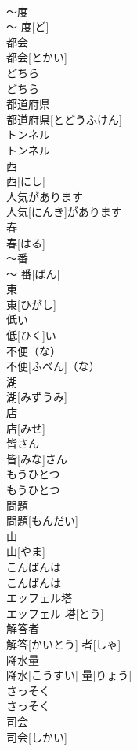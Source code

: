 \documentclass[8pt]{extreport}
\begin{document}
\begin{CJK}{UTF8}{min}
\\	〜度	
\\	〜 度[ど]		
\\	都会	
\\	都会[とかい]		
\\	どちら	
\\	どちら		
\\	都道府県	
\\	都道府県[とどうふけん]		
\\	トンネル	
\\	トンネル		
\\	西	
\\	西[にし]		
\\	人気があります	
\\	人気[にんき]があります		
\\	春	
\\	春[はる]		
\\	〜番	
\\	〜 番[ばん]		
\\	東	
\\	東[ひがし]		
\\	低い	
\\	低[ひく]い		
\\	不便（な）	
\\	不便[ふべん]（な）		
\\	湖	
\\	湖[みずうみ]		
\\	店	
\\	店[みせ]		
\\	皆さん	
\\	皆[みな]さん		
\\	もうひとつ	
\\	もうひとつ		
\\	問題	
\\	問題[もんだい]		
\\	山	
\\	山[やま]		
\\	こんばんは	
\\	こんばんは		
\\	エッフェル塔	
\\	エッフェル 塔[とう]		
\\	解答者	
\\	解答[かいとう] 者[しゃ]		
\\	降水量	
\\	降水[こうすい] 量[りょう]		
\\	さっそく	
\\	さっそく		
\\	司会	
\\	司会[しかい]		

\end{CJK}
\end{document}
